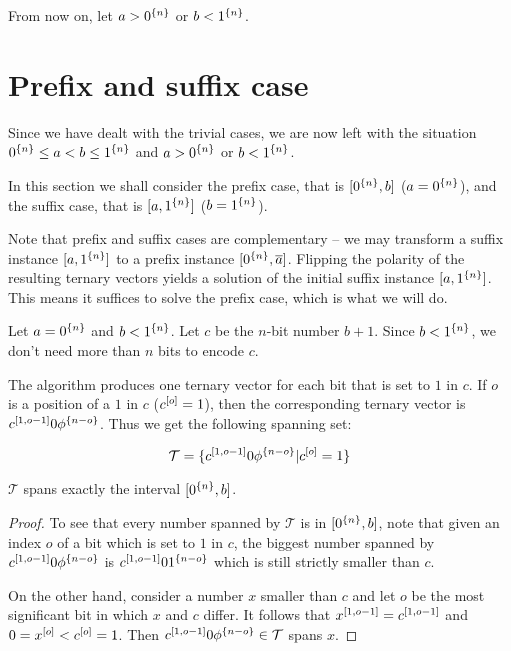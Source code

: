From now on,
let $a > 0^{\{n\}}$ or $b < 1^{\{n\}}$.

\section{Prefix and suffix case}
\label{sec:prefixsuffix}

Since we have dealt with the trivial cases,
we are now left with the situation
$0^{\{n\}} \leq a < b \leq 1^{\{n\}}$
and
$a > 0^{\{n\}}$ or $b < 1^{\{n\}}$.

In this section we shall consider the prefix case,
that is $[0^{\{n\}}, b]$ ($a = 0^{\{n\}}$),
and the suffix case,
that is $[a, 1^{\{n\}}]$ ($b = 1^{\{n\}}$).

Note that prefix and suffix cases are complementary --
we may transform a suffix instance
$[a, 1^{\{n\}}]$
to a prefix instance $[0^{\{n\}}, \overline{a}]$.
Flipping the polarity of the resulting ternary vectors
yields a solution
of the initial suffix instance
$[a, 1^{\{n\}}]$.
This means it suffices to solve the prefix case,
which is what we will do.

Let $a = 0^{\{n\}}$ and $b < 1^{\{n\}}$.
Let $c$ be the $n$-bit number $b + 1$.
Since $b < 1^{\{n\}}$,
we don't need more than $n$ bits to encode $c$.

The algorithm produces one ternary vector
for each bit that is set to $1$ in $c$.
If $o$ is a position of a $1$ in $c$
($c^{[o]} = 1$),
then the corresponding ternary vector
is $c^{[1, o - 1]} 0 \phi^{\{n - o\}}$.
Thus we get the following spanning set:

\begin{equation*}
\mathcal{T} =
\{c^{[1, o - 1]} 0 \phi^{\{n - o\}} | c^{[o]} = 1\}
\end{equation*}

\begin{theorem}[Feasibility]
\label{theorem:prefixfeasible}
$\mathcal{T}$ spans exactly the interval
$[0^{\{n\}}, b]$.
\end{theorem}

\begin{proof}
To see that every number spanned by $\mathcal{T}$
is in $[0^{\{n\}}, b]$,
note that given an index $o$ of a bit which is set to $1$
in $c$,
the biggest number spanned by
$c^{[1, o-1]} 0 \phi^{\{n-o\}}$ is
$c^{[1, o-1]} 0 1^{\{n-o\}}$
which is still strictly smaller than $c$.

On the other hand,
consider a number $x$ smaller than $c$
and let $o$ be the most significant bit in which $x$ and $c$ differ. It follows that
$x^{[1, o-1]} = c^{[1, o-1]}$
and $0 = x^{[o]} < c^{[o]} = 1$.
Then
$c^{[1, o - 1]} 0 \phi^{\{n - o\}} \in \mathcal{T}$
spans $x$.
\end{proof}

